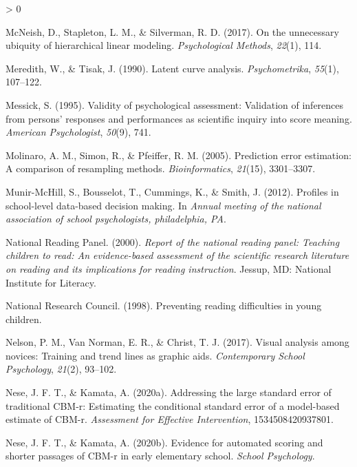 \documentclass[
  english,
  man, fleqn, noextraspace]{apa6}
\newlength{\cslhangindent}
\newenvironment{CSLReferences}[2] %
 {%
  \setlength{\parindent}{0pt}
  \ifodd #1 \everypar{\setlength{\hangindent}{\cslhangindent}}\ignorespaces\fi
  \ifnum #2 > 0
  \setlength{\parskip}{#2\baselineskip}
  \fi
 }%
 {}
\begin{document}
\begin{CSLReferences}{1}{0}
\leavevmode\hypertarget{ref-mcneishetal2017}{}%
McNeish, D., Stapleton, L. M., \& Silverman, R. D. (2017). On the unnecessary ubiquity of hierarchical linear modeling. \emph{Psychological Methods}, \emph{22}(1), 114.

\leavevmode\hypertarget{ref-meredithtisak1990}{}%
Meredith, W., \& Tisak, J. (1990). Latent curve analysis. \emph{Psychometrika}, \emph{55}(1), 107--122.

\leavevmode\hypertarget{ref-messick1995}{}%
Messick, S. (1995). Validity of psychological assessment: Validation of inferences from persons' responses and performances as scientific inquiry into score meaning. \emph{American Psychologist}, \emph{50}(9), 741.

\leavevmode\hypertarget{ref-molinaro2005}{}%
Molinaro, A. M., Simon, R., \& Pfeiffer, R. M. (2005). Prediction error estimation: A comparison of resampling methods. \emph{Bioinformatics}, \emph{21}(15), 3301--3307.

\leavevmode\hypertarget{ref-munir2012}{}%
Munir-McHill, S., Bousselot, T., Cummings, K., \& Smith, J. (2012). Profiles in school-level data-based decision making. In \emph{Annual meeting of the national association of school psychologists, philadelphia, PA}.

\leavevmode\hypertarget{ref-readingpanel2000}{}%
National Reading Panel. (2000). \emph{Report of the national reading panel: Teaching children to read: An evidence-based assessment of the scientific research literature on reading and its implications for reading instruction}. Jessup, MD: National Institute for Literacy.

\leavevmode\hypertarget{ref-national1998}{}%
National Research Council. (1998). Preventing reading difficulties in young children.

\leavevmode\hypertarget{ref-nelson2017}{}%
Nelson, P. M., Van Norman, E. R., \& Christ, T. J. (2017). Visual analysis among novices: Training and trend lines as graphic aids. \emph{Contemporary School Psychology}, \emph{21}(2), 93--102.

\leavevmode\hypertarget{ref-nese2020sem}{}%
Nese, J. F. T., \& Kamata, A. (2020a). Addressing the large standard error of traditional CBM-r: Estimating the conditional standard error of a model-based estimate of CBM-r. \emph{Assessment for Effective Intervention}, 1534508420937801.

\leavevmode\hypertarget{ref-nese2020asr}{}%
Nese, J. F. T., \& Kamata, A. (2020b). Evidence for automated scoring and shorter passages of CBM-r in early elementary school. \emph{School Psychology}.


\end{CSLReferences}
\end{document}
